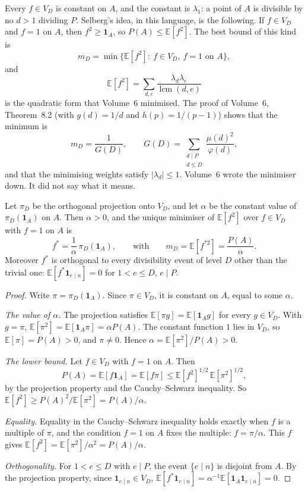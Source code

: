 Every $f\in V_D$ is constant on $A$, and the constant is $\lambda_1$: a point of $A$ is divisible by no $d>1$ dividing $P$. Selberg's idea, in this language, is the following. If $f\in V_D$ and $f=1$ on $A$, then $f^2\ge\mathbf 1_A$, so $P(A)\le\mathbb E[f^2]$. The best bound of this kind is
\[
m_D=\min\bigl\{\mathbb E[f^2]:\ f\in V_D,\ f=1\text{ on }A\bigr\},
\]
and
\[
\mathbb E[f^2]=\sum_{d,e}\frac{\lambda_d\lambda_e}{\operatorname{lcm}(d,e)}
\]
is the quadratic form that Volume~6 minimised. The proof of Volume~6, Theorem~8.2 (with $g(d)=1/d$ and $h(p)=1/(p-1)$) shows that the minimum is
\[
m_D=\frac1{G(D)},\qquad G(D)=\sum_{\substack{d\mid P\\d\le D}}\frac{\mu(d)^2}{\varphi(d)},
\]
and that the minimising weights satisfy $|\lambda_d|\le1$. Volume~6 wrote the minimiser down. It did not say what it means.

\begin{theorem}\label{thm:selbergproj}
Let $\pi_D$ be the orthogonal projection onto $V_D$, and let $\alpha$ be the constant value of $\pi_D(\mathbf 1_A)$ on $A$. Then $\alpha>0$, and the unique minimiser of $\mathbb E[f^2]$ over $f\in V_D$ with $f=1$ on $A$ is
\[
f^*=\frac1\alpha\,\pi_D(\mathbf 1_A),\qquad\text{with}\qquad m_D=\mathbb E[f^{*2}]=\frac{P(A)}\alpha.
\]
Moreover $f^*$ is orthogonal to every divisibility event of level $D$ other than the trivial one: $\mathbb E[f^*\mathbf 1_{e\mid n}]=0$ for $1<e\le D$, $e\mid P$.
\end{theorem}
\begin{proof}
Write $\pi=\pi_D(\mathbf 1_A)$. Since $\pi\in V_D$, it is constant on $A$, equal to some $\alpha$.

\emph{The value of $\alpha$.} The projection satisfies $\mathbb E[\pi g]=\mathbb E[\mathbf 1_Ag]$ for every $g\in V_D$. With $g=\pi$, $\mathbb E[\pi^2]=\mathbb E[\mathbf 1_A\pi]=\alpha P(A)$. The constant function $1$ lies in $V_D$, so $\mathbb E[\pi]=P(A)>0$, and $\pi\ne0$. Hence $\alpha=\mathbb E[\pi^2]/P(A)>0$.

\emph{The lower bound.} Let $f\in V_D$ with $f=1$ on $A$. Then
\[
P(A)=\mathbb E[f\mathbf 1_A]=\mathbb E[f\pi]\le\mathbb E[f^2]^{1/2}\,\mathbb E[\pi^2]^{1/2},
\]
by the projection property and the Cauchy--Schwarz inequality. So $\mathbb E[f^2]\ge P(A)^2/\mathbb E[\pi^2]=P(A)/\alpha$.

\emph{Equality.} Equality in the Cauchy--Schwarz inequality holds exactly when $f$ is a multiple of $\pi$, and the condition $f=1$ on $A$ fixes the multiple: $f=\pi/\alpha$. This $f$ gives $\mathbb E[f^2]=\mathbb E[\pi^2]/\alpha^2=P(A)/\alpha$.

\emph{Orthogonality.} For $1<e\le D$ with $e\mid P$, the event $\{e\mid n\}$ is disjoint from $A$. By the projection property, since $\mathbf 1_{e\mid n}\in V_D$, $\mathbb E[f^*\mathbf 1_{e\mid n}]=\alpha^{-1}\mathbb E[\mathbf 1_A\mathbf 1_{e\mid n}]=0$.
\end{proof}

